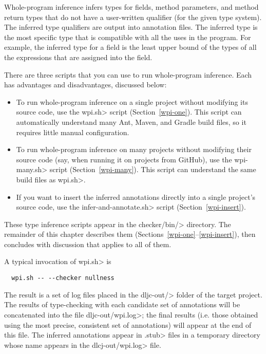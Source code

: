 
Whole-program inference
infers types for fields, method parameters, and method return types that do not
have a user-written qualifier (for the given type system).
The inferred type qualifiers are output into annotation files.
The inferred type is the most specific type that is compatible with all the
uses in the program.  For example, the inferred type for a field is the
least upper bound of the types of all the expressions that are assigned
into the field.

There are three scripts that you can use to run whole-program inference.
Each has advantages and disadvantages, discussed below:

\begin{itemize}
    \item
    To run whole-program inference on a single project without modifying its source code,
    use the \<wpi.sh> script (Section~\ref{wpi-one}). This script can automatically understand
    many Ant, Maven, and Gradle build files, so it requires little manual configuration.

    \item
    To run whole-program inference on many projects without modifying their source code
    (say, when running it on projects from GitHub), use the \<wpi-many.sh> script (Section~\ref{wpi-many}).
    This script can understand the same build files as \<wpi.sh>.

    \item
    If you want to insert the inferred annotations directly into a single
    project's source code, use the \<infer-and-annotate.sh> script (Section~\ref{wpi-insert}).
\end{itemize}

These type inference scripts appear in the \<checker/bin/> directory.
The remainder of this chapter describes them
(Sections~\ref{wpi-one}--\ref{wpi-insert}), then concludes with discussion
that applies to all of them.



A typical invocation of \<wpi.sh> is

\begin{Verbatim}
  wpi.sh -- --checker nullness
\end{Verbatim}

The result is a set of log files placed in the \<dljc-out/> folder of the
target project. The results of type-checking with each candidate set of
annotations will be concatenated into the file \<dljc-out/wpi.log>; the final
results (i.e. those obtained using the most precise, consistent set of annotations)
will appear at the end of this file.
The inferred annotations appear in \<.stub> files in a
temporary directory whose name appears in the \<dlcj-out/wpi.log> file.

